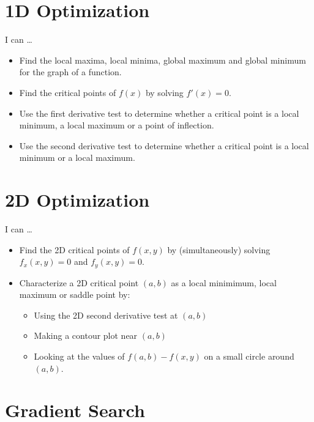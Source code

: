 \documentclass[
]{book}
\providecommand{\tightlist}{%
  \setlength{\itemsep}{0pt}\setlength{\parskip}{0pt}}
\begin{document}
\hypertarget{d-optimization-2}{%
\section{1D Optimization}\label{d-optimization-2}}

I can \ldots{}

\begin{itemize}
\tightlist
\item
  Find the local maxima, local minima, global maximum and global minimum for the graph of a function.
\item
  Find the critical points of \(f(x)\) by solving \(f'(x)=0\).
\item
  Use the first derivative test to determine whether a critical point is a local minimum, a local maximum or a point of inflection.
\item
  Use the second derivative test to determine whether a critical point is a local minimum or a local maximum.
\end{itemize}

\hypertarget{d-optimization-3}{%
\section{2D Optimization}\label{d-optimization-3}}

I can \ldots{}

\begin{itemize}
\tightlist
\item
  Find the 2D critical points of \(f(x,y)\) by (simultaneously) solving \(f_x(x,y)=0\) and \(f_y(x,y)=0\).
\item
  Characterize a 2D critical point \((a,b)\) as a local minimimum, local maximum or saddle point by:

  \begin{itemize}
  \tightlist
  \item
    Using the 2D second derivative test at \((a,b)\)
  \item
    Making a contour plot near \((a,b)\)
  \item
    Looking at the values of \(f(a,b)-f(x,y)\) on a small circle around \((a,b)\).
  \end{itemize}
\end{itemize}

\hypertarget{gradient-search-2}{%
\section{Gradient Search}\label{gradient-search-2}}
\end{document}
